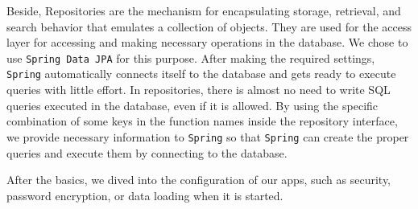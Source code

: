 Beside, Repositories are the mechanism for encapsulating storage, retrieval, and search behavior that emulates a collection of objects. They are used for the access layer for accessing and making necessary operations in the database. We chose to use \texttt{Spring Data JPA} for this purpose. After making the required settings, \texttt{Spring} automatically connects itself to the database and gets ready to execute queries with little effort. In repositories, there is almost no need to write SQL queries executed in the database, even if it is allowed. By using the specific combination of some keys in the function names inside the repository interface, we provide necessary information to \texttt{Spring} so that \texttt{Spring} can create the proper queries and execute them by connecting to the database.

After the basics, we dived into the configuration of our apps, such as security, password encryption, or data loading when it is started.
